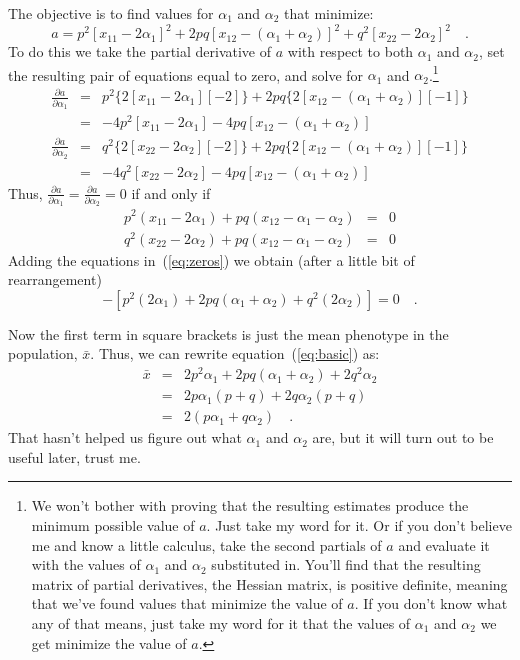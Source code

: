 \documentclass[12pt]{article}
\begin{document}
The objective is to find values for $\alpha_1$ and $\alpha_2$ that
minimize:
\[
a = p^2[x_{11}-2\alpha_1]^2
       + 2pq[x_{12}-(\alpha_1+\alpha_2)]^2
       + q^2[x_{22}-2\alpha_2]^2 \quad .
\]
To do this we take the partial derivative of $a$ with respect to both
$\alpha_1$ and $\alpha_2$, set the resulting pair of equations equal
to zero, and solve for $\alpha_1$ and $\alpha_2$.\footnote{We won't
  bother with proving that the resulting estimates produce the minimum
  possible value of $a$. Just take my word for it. Or if you don't
  believe me and know a little calculus, take the second partials of
  $a$ and evaluate it with the values of $\alpha_1$ and $\alpha_2$
  substituted in. You'll find that the resulting matrix of partial
  derivatives, the Hessian matrix, is positive definite, meaning that
  we've found values that minimize the value of $a$. If you don't know
  what any of that means, just take my word for it that the values of
  $\alpha_1$ and $\alpha_2$ we get minimize the value of $a$.}
\begin{eqnarray*}
\frac{\partial a}{\partial{\alpha_1}} &=& p^2\{2[x_{11} - 2\alpha_1][-2]\}
                     + 2pq\{2[x_{12} - (\alpha_1+\alpha_2)][-1]\} \\
                  &=& -4p^2[x_{11} - 2\alpha_1]
                     -4pq[x_{12} - (\alpha_1+\alpha_2)] \\
\frac{\partial a}{\partial{\alpha_2}} &=& q^2\{2[x_{22} - 2\alpha_2][-2]\}
                     + 2pq\{2[x_{12} - (\alpha_1+\alpha_2)][-1]\} \\
                  &=& -4q^2[x_{22} - 2\alpha_2]
                     -4pq[x_{12} - (\alpha_1+\alpha_2)]
\end{eqnarray*}
Thus, $\frac{\partial a}{\partial{\alpha_1}} = \frac{\partial a}{\partial{\alpha_2}} = 0$ if and only if
\begin{eqnarray}
p^2(x_{11} - 2\alpha_1) + pq(x_{12} - \alpha_1 - \alpha_2) &=& 0
  \nonumber \\
q^2(x_{22} - 2\alpha_2) + pq(x_{12} - \alpha_1 - \alpha_2) &=& 0
\label{eq:zeros}
\end{eqnarray}
Adding the equations in~(\ref{eq:zeros}) we obtain (after a little bit
of rearrangement)
\begin{equation}
[p^2x_{11} + 2pqx_{12} + q^2x_{22}] -
   [p^2(2\alpha_1) + 2pq(\alpha_1 + \alpha_2) + q^2(2\alpha_2)] = 0 \quad .
\label{eq:basic}
\end{equation}

Now the first term in square brackets is just the mean phenotype in
the population, $\bar x$.  Thus, we can rewrite
equation~(\ref{eq:basic}) as:
\begin{eqnarray}
{\bar x} &=& 2p^2\alpha_1 + 2pq(\alpha_1 + \alpha_2)
                        +2q^2\alpha_2 \nonumber \\
                     &=& 2p\alpha_1(p+q) + 2q\alpha_2(p+q) \nonumber \\
                     &=& 2(p\alpha_1 + q\alpha_2) \quad . \label{eq:alpha_bar}
\end{eqnarray}
That hasn't helped us figure out what $\alpha_1$ and $\alpha_2$ are,
but it will turn out to be useful later, trust me.
\end{document}

